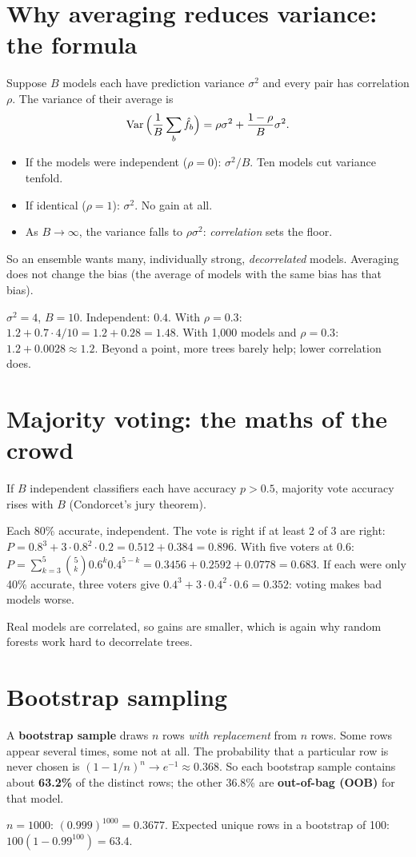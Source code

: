 \section{Why averaging reduces variance: the formula}
Suppose $B$ models each have prediction variance $\sigma^2$ and every pair has correlation $\rho$. The variance of their average is
\[ \operatorname{Var}\Big(\frac1B\sum_b \hat f_b\Big) = \rho\sigma^2 + \frac{1-\rho}{B}\sigma^2. \]
\begin{itemize}
\item If the models were independent ($\rho = 0$): $\sigma^2/B$. Ten models cut variance tenfold.
\item If identical ($\rho = 1$): $\sigma^2$. No gain at all.
\item As $B\to\infty$, the variance falls to $\rho\sigma^2$: \emph{correlation} sets the floor.
\end{itemize}
So an ensemble wants many, individually strong, \emph{decorrelated} models. Averaging does not change the bias (the
average of models with the same bias has that bias).

\begin{example}
$\sigma^2 = 4$, $B = 10$. Independent: $0.4$. With $\rho = 0.3$: $1.2 + 0.7\cdot4/10 = 1.2 + 0.28 = 1.48$. With 1{,}000 models
and $\rho = 0.3$: $1.2 + 0.0028 \approx 1.2$. Beyond a point, more trees barely help; lower correlation does.
\end{example}

\section{Majority voting: the maths of the crowd}
If $B$ independent classifiers each have accuracy $p > 0.5$, majority vote accuracy rises with $B$ (Condorcet's jury theorem).
\begin{example}
Each 80\% accurate, independent. The vote is right if at least 2 of 3 are right:
$P = 0.8^3 + 3\cdot0.8^2\cdot0.2 = 0.512 + 0.384 = 0.896$. With five voters at 0.6: $P = \sum_{k=3}^5\binom5k0.6^k0.4^{5-k} =
0.3456 + 0.2592 + 0.0778 = 0.683$.
If each were only 40\% accurate, three voters give $0.4^3 + 3\cdot0.4^2\cdot0.6 = 0.352$: voting makes bad models worse.
\end{example}
Real models are correlated, so gains are smaller, which is again why random forests work hard to decorrelate trees.

\section{Bootstrap sampling}
A \textbf{bootstrap sample} draws $n$ rows \emph{with replacement} from $n$ rows. Some rows appear several times, some not at all.
The probability that a particular row is never chosen is $(1 - 1/n)^n \to e^{-1} \approx 0.368$. So each bootstrap sample contains
about \textbf{63.2\%} of the distinct rows; the other 36.8\% are \textbf{out-of-bag (OOB)} for that model.
\begin{example}
$n = 1000$: $(0.999)^{1000} = 0.3677$. Expected unique rows in a bootstrap of 100: $100(1 - 0.99^{100}) = 63.4$.
\end{example}

